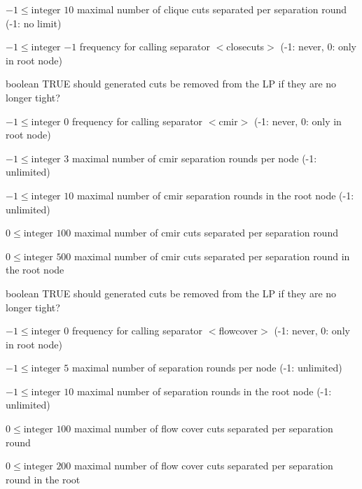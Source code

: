 %
{$-1\leq\textrm{integer}$}%
{$10$}%
{maximal number of clique cuts separated per separation round (-1: no limit)}%
{}

%
{$-1\leq\textrm{integer}$}%
{$-1$}%
{frequency for calling separator $<$closecuts$>$ (-1: never, 0: only in root node)}%
{}

%
{boolean}%
{TRUE}%
{should generated cuts be removed from the LP if they are no longer tight?}%
{}

%
{$-1\leq\textrm{integer}$}%
{$0$}%
{frequency for calling separator $<$cmir$>$ (-1: never, 0: only in root node)}%
{}

%
{$-1\leq\textrm{integer}$}%
{$3$}%
{maximal number of cmir separation rounds per node (-1: unlimited)}%
{}

%
{$-1\leq\textrm{integer}$}%
{$10$}%
{maximal number of cmir separation rounds in the root node (-1: unlimited)}%
{}

%
{$0\leq\textrm{integer}$}%
{$100$}%
{maximal number of cmir cuts separated per separation round}%
{}

%
{$0\leq\textrm{integer}$}%
{$500$}%
{maximal number of cmir cuts separated per separation round in the root node}%
{}

%
{boolean}%
{TRUE}%
{should generated cuts be removed from the LP if they are no longer tight?}%
{}

%
{$-1\leq\textrm{integer}$}%
{$0$}%
{frequency for calling separator $<$flowcover$>$ (-1: never, 0: only in root node)}%
{}

%
{$-1\leq\textrm{integer}$}%
{$5$}%
{maximal number of separation rounds per node (-1: unlimited)}%
{}

%
{$-1\leq\textrm{integer}$}%
{$10$}%
{maximal number of separation rounds in the root node (-1: unlimited)}%
{}

%
{$0\leq\textrm{integer}$}%
{$100$}%
{maximal number of flow cover cuts separated per separation round}%
{}

%
{$0\leq\textrm{integer}$}%
{$200$}%
{maximal number of flow cover cuts separated per separation round in the root}%
{}

